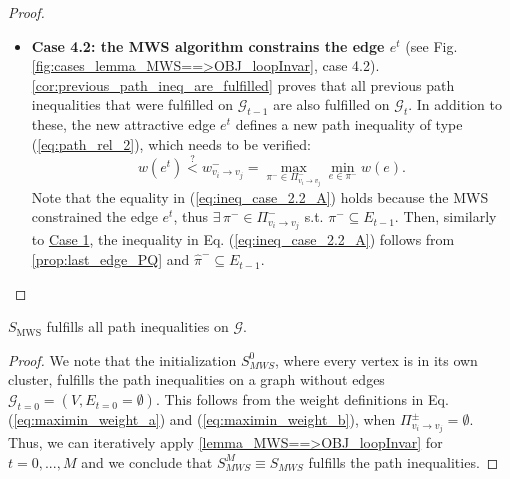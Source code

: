 \begin{proof}
\begin{itemize}
\item \textbf{Case 4.2: the MWS algorithm constrains the edge\textbf{ $e^{t}$}} (see Fig. \ref{fig:cases_lemma_MWS==>OBJ_loopInvar}, case 4.2). \autoref{cor:previous_path_ineq_are_fulfilled} proves that all previous path inequalities that were fulfilled on $\mathcal{G}_{t-1}$ are also fulfilled on $\mathcal{G}_{t}$. In addition to these, the new attractive edge $e^t$ defines a new path inequality of type (\ref{eq:path_rel_2}), which needs to be verified:
\begin{equation}
w(e^t) \stackrel{?}{<} w_{v_{i}\rightarrow v_{j}}^{-} = \max_{\pi^{-}\in\Pi_{v_{i}\rightarrow v_{j}}^{-}}\underset{e\in\pi^{-}}{\min}w(e).\label{eq:ineq_case_2.2_A}
\end{equation}
Note that the equality in (\ref{eq:ineq_case_2.2_A}) holds because the MWS constrained the edge $e^{t}$, thus  $\exists \, \pi^-\in \Pi_{v_{i}\rightarrow v_{j}}^{-}$ s.t. $\pi^-\subseteq E_{t-1}$. Then, similarly to \hyperref[case:repuslive_edge_not_on_cut]{Case 1}, 
the inequality in Eq.
(\ref{eq:ineq_case_2.2_A}) follows from \autoref{prop:last_edge_PQ} and $\hat{\pi}^-\subseteq E_{t-1}$.

\end{itemize}
\end{proof}

\begin{lemma}
\label{lemma_MWS==>OBJ}$S_{\mathrm{MWS}}$ fulfills all
path inequalities on $\mathcal{G}$. 
\end{lemma}
\begin{proof}
We note that the initialization $S^0_{MWS}$, where every vertex is in its own cluster, fulfills the path inequalities on a
graph without edges ${\mathcal{G}_{t=0}=(V,E_{t=0}=\emptyset)}$. This follows from
the weight definitions in Eq. (\ref{eq:maximin_weight_a}) and (\ref{eq:maximin_weight_b}), when $\Pi_{v_{i}\rightarrow v_{j}}^{\pm}=\emptyset$.
Thus, we can iteratively apply \autoref{lemma_MWS==>OBJ_loopInvar}
for $t=0,...,M$ and we conclude that $S^M_{MWS} \equiv S_{MWS}$ fulfills the path inequalities.
\end{proof}

